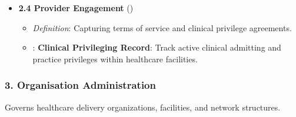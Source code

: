 \begin{itemize}
\begin{itemize}

\item
\emph{Definition}: Managing organizational affiliations and multidisciplinary team relationships.



\item
\texttt{}: \textbf{Practitioner-Organisation Affiliation}: Maintain temporal affiliations between practitioners and healthcare organizations.



\end{itemize}


\item
\textbf{2.4 Provider Engagement} (\texttt{})


\begin{itemize}

\item
\emph{Definition}: Capturing terms of service and clinical privilege agreements.



\item
\texttt{}: \textbf{Clinical Privileging Record}: Track active clinical admitting and practice privileges within healthcare facilities.



\end{itemize}


\end{itemize}
\label{rad:enabling:158}
\subsubsection*{3. Organisation Administration}
\label{rad:enabling:159}

Governs healthcare delivery organizations, facilities, and network structures.

\label{rad:enabling:161}

